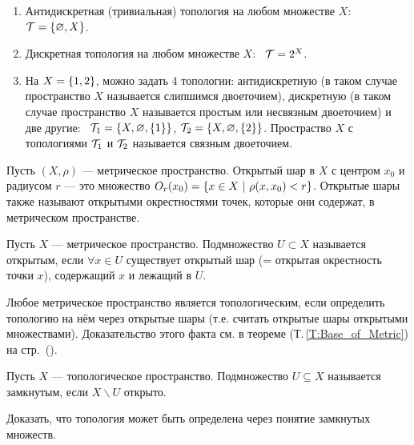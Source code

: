 \begin{example}
    \begin{enumerate}
        \item Антидискретная (тривиальная) топология на любом множестве $X$: \ $\mathcal{T} = \left\{\varnothing, X\right\}$.
        \item Дискретная топология на любом множестве $X$: \ $\mathcal{T} = 2^X$.
        \item На $X = \left\{1, 2\right\}$, можно задать 4 топологии: антидискретную (в таком случае пространство $X$ называется слипшимся двоеточием), дискретную (в таком случае пространство $X$ называется простым или несвязным двоеточием) и две другие: \ $\mathcal{T}_1 = \left\{X, \varnothing, \left\{1\right\}\right\}$, $\mathcal{T}_2 = \left\{X, \varnothing, \left\{2\right\}\right\}$.
        Простраство $X$ с топологиями $\mathcal{T}_1$ и $\mathcal{T}_2$ называется связным двоеточием.
    \end{enumerate}
\end{example}

\begin{definition}
    Пусть $(X, \rho)$ --- метрическое пространство. Открытый шар в $X$ с центром $x_0$ и радиусом $r$ --- это множество $O_r(x_0) = \cbr{x \in X \ | \ \rho(x, x_0) < r}$. Открытые шары также называют открытыми окрестностями точек, которые они содержат, в метрическом пространстве.
\end{definition}

\begin{definition}
    Пусть $X$ --- метрическое пространство. Подмножество $U \subset X$ называется открытым, если $\forall x \in U$ существует открытый шар (= открытая окрестность точки $x$), содержащий $x$ и лежащий в $U$. 
\end{definition}

\begin{nota_bene}
    Любое метрическое пространство является топологическим, если определить топологию на нём через открытые шары (т.е. считать открытые шары открытыми множествами). Доказательство этого факта см. в теореме (Т.\,\ref{T:Base_of_Metric}) на стр.~(\pageref{T:Base_of_Metric}).
\end{nota_bene}

\begin{definition}
    Пусть $X$ --- топологическое пространство. Подмножество $U \subseteq X$ называется замкнутым, если $X \backslash U$ открыто.
\end{definition}

\begin{exercise}
    Доказать, что топология может быть определена через понятие замкнутых множеств.
\end{exercise}

